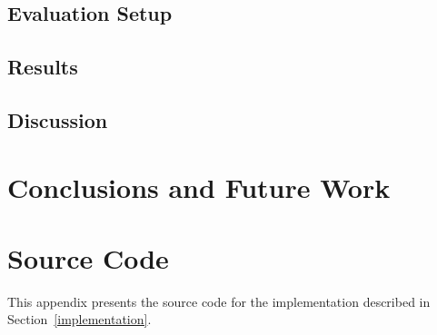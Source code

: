 \documentclass[a4paper,11pt]{article}
\newcommand{\Chapref}[1]{Section~\ref{#1}}
\begin{document}
\subsection{Evaluation Setup}
\label{evaluation:setup}
\subsection{Results}
\label{evaluation:results}
\subsection{Discussion}
\label{evaluation:discussion}

\section{Conclusions and Future Work}
\label{conclusions}




\appendix
\section{Source Code}
\label{source code}

This appendix presents the source code for the implementation described in \Chapref{implementation}.
\end{document}
